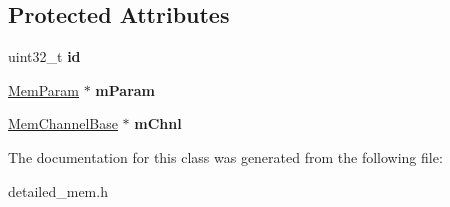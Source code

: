 \subsection*{Protected Attributes}
\begin{DoxyCompactItemize}
\item 
\hypertarget{classMemSchedulerBase_a820bdc46cceb0d6bb7474cf53dcd1ab2}{uint32\-\_\-t {\bfseries id}}\label{classMemSchedulerBase_a820bdc46cceb0d6bb7474cf53dcd1ab2}

\item 
\hypertarget{classMemSchedulerBase_a2c4a5f70ca0cc84245047a0e412b8d2e}{\hyperlink{classMemParam}{Mem\-Param} $\ast$ {\bfseries m\-Param}}\label{classMemSchedulerBase_a2c4a5f70ca0cc84245047a0e412b8d2e}

\item 
\hypertarget{classMemSchedulerBase_a9b85e1e34a7208c3af7a19538e174b0b}{\hyperlink{classMemChannelBase}{Mem\-Channel\-Base} $\ast$ {\bfseries m\-Chnl}}\label{classMemSchedulerBase_a9b85e1e34a7208c3af7a19538e174b0b}

\end{DoxyCompactItemize}


The documentation for this class was generated from the following file\-:\begin{DoxyCompactItemize}
\item 
detailed\-\_\-mem.\-h\end{DoxyCompactItemize}
